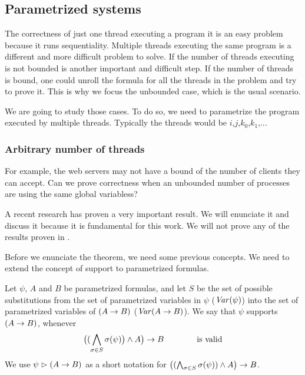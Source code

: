 \subsection{Parametrized systems}

The correctness of just one thread executing a program it is an easy problem because it runs sequentiality.
%
Multiple threads executing the same program is a different and more difficult problem to solve.
%
If the number of threads executing is not bounded is another important and difficult step.
%
If the number of threads is bound, one could unroll the formula for all the threads in the problem and try to prove it. 
%
This is why we focus the unbounded case, which is the usual scenario.

We are going to study those cases. 
%
To do so, we need to parametrize the program executed by multiple threads.
%
Typically the threads would be $i$,$j$,$k_0$,$k_1$,... 



\subsubsection{Arbitrary number of threads}


For example, the web servers may not have a bound of the number of clients they can accept.
%
Can we prove correctness when an unbounded number of processes are using the same global variabless?

A recent research  has proven a very important result. 
%
We will enunciate it and discuss it because it is fundamental for this work. 
%
We will not prove any of the results proven in \citep{paperParametrizedInvariants}.

Before we enunciate the theorem, we need some previous concepts.
%
We need to extend the concept of support to parametrized formulas.


\begin{defn}[Support]
  Let $\psi$, $A$ and $B$ be parametrized formulas, and let $S$ be the
  set of possible substitutions from the set of parametrized variables in $\psi$ ($\mathit{Var}(\psi)$) into the set of parametrized variables of $(A\mathrel{\rightarrow} B)$ ($\mathit{Var}(A\mathrel{\rightarrow} B)$).
%
  We say that $\psi$ supports $(A\mathrel{\rightarrow} B)$, whenever
%
  \[ \big( (\bigwedge_{\sigma\in S} \sigma(\psi)\big) \wedge A\big) \mathrel{\rightarrow} B \hspace{4em} \text{is valid} \]
%
  We use $\psi\mathrel{\rhd}(A\mathrel{\rightarrow} B)$ as a short notation for
  $\big((\bigwedge_{\sigma\in S} \sigma(\psi)) \wedge A\big) \mathrel{\rightarrow} B$.  
\end{defn}

